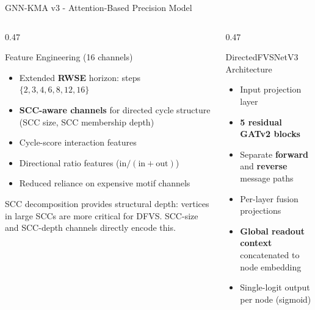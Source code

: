 \documentclass[aspectratio=169]{beamer}
\renewcommand{\footnotesize}{\tiny}
\begin{document}
\begin{frame}{GNN-KMA v3 - Attention-Based Precision Model}
	\tiny
	\begin{columns}[T]
		\begin{column}{0.47\textwidth}
			\begin{block}{Feature Engineering (16 channels)}
				\begin{itemize}\setlength\itemsep{2pt}
					\item Extended \textbf{RWSE} horizon: steps $\{2,3,4,6,8,12,16\}$
					      \cite{dwivedi2021}
					\item \textbf{SCC-aware channels} for directed cycle structure
					      (SCC size, SCC membership depth)
					\item Cycle-score interaction features
					\item Directional ratio features ($\text{in}/(\text{in}+\text{out})$)
					\item Reduced reliance on expensive motif channels
				\end{itemize}
			\end{block}
			\vspace{3pt}
			\begin{tcolorbox}[algbox,title=SCC Channels (Directed)]
				\footnotesize
				SCC decomposition \cite{tarjan1972} provides structural depth:
				vertices in large SCCs are more critical for DFVS.
				SCC-size and SCC-depth channels directly encode this.
			\end{tcolorbox}
		\end{column}
		\begin{column}{0.47\textwidth}
			\begin{block}{DirectedFVSNetV3 Architecture}
				\begin{itemize}\setlength\itemsep{2pt}
					\item Input projection layer
					\item \textbf{5 residual GATv2 blocks} \cite{brody2022}
					\item Separate \textbf{forward} and \textbf{reverse} message paths
					\item Per-layer fusion projections
					\item \textbf{Global readout context} concatenated to node embedding
					\item Single-logit output per node (sigmoid)
				\end{itemize}
			\end{block}
			\vspace{3pt}

\end{column}
\end{columns}
\end{frame}
\end{document}
